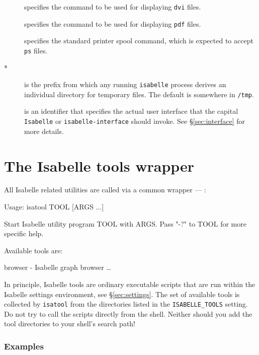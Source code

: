\begin{description}
\item[] specifies the command to be used for displaying
  \texttt{dvi} files.
  
\item[] specifies the command to be used for displaying
  \texttt{pdf} files.
  
\item[] specifies the standard printer spool command,
  which is expected to accept \texttt{ps} files.
  
\item[*] is the prefix from which any running
  \texttt{isabelle} process derives an individual directory for temporary
  files.  The default is somewhere in \texttt{/tmp}.
  
\item[] is an identifier that specifies the actual
  user interface that the capital \texttt{Isabelle} or
  \texttt{isabelle-interface} should invoke.  See \S\ref{sec:interface} for
  more details.

\end{description}


\section{The Isabelle tools wrapper} \label{sec:isatool}

All Isabelle related utilities are called via a common wrapper ---
:
\begin{ttbox}
Usage: isatool TOOL [ARGS ...]

  Start Isabelle utility program TOOL with ARGS. Pass "-?" to TOOL
  for more specific help.

  Available tools are:

    browser - Isabelle graph browser
    \dots
\end{ttbox}
In principle, Isabelle tools are ordinary executable scripts that are run
within the Isabelle settings environment, see \S\ref{sec:settings}.  The set
of available tools is collected by \texttt{isatool} from the directories
listed in the \texttt{ISABELLE_TOOLS} setting.  Do not try to call the scripts
directly from the shell.  Neither should you add the tool directories to your
shell's search path!


\subsubsection*{Examples}

